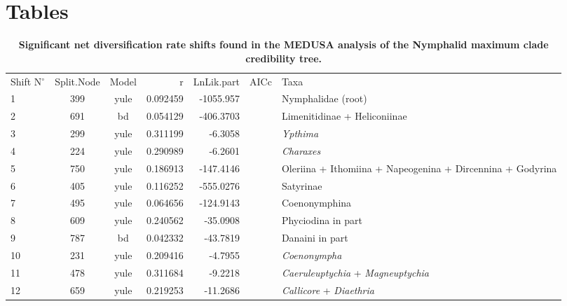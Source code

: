 \documentclass[10pt]{article}
\begin{document}
\section*{Tables}
\begin{table}[!h]
\caption{\bf{Significant net diversification rate shifts found in the MEDUSA analysis of the Nymphalid maximum clade credibility tree.}}
\begin{tabular}{lccrrcl}
Shift N$^\circ$ & Split.Node & Model & r          & LnLik.part & AICc     & Taxa                                                       \\
1               & 399        & yule  & 0.092459   & -1055.957  &          & Nymphalidae (root)                                         \\
2               & 691        & bd    & 0.054129   & -406.3703  &          & Limenitidinae + Heliconiinae                               \\
3               & 299        & yule  & 0.311199   & -6.3058    &          & \emph{Ypthima}                                             \\
4               & 224        & yule  & 0.290989   & -6.2601    &          & \emph{Charaxes}                                            \\
5               & 750        & yule  & 0.186913   & -147.4146  &          & Oleriina + Ithomiina + Napeogenina + Dircennina + Godyrina \\
6               & 405        & yule  & 0.116252   & -555.0276  &          & Satyrinae                                                   \\
7               & 495        & yule  & 0.064656   & -124.9143  &          & Coenonymphina                                              \\
8               & 609        & yule  & 0.240562   & -35.0908   &          & Phyciodina in part                                         \\
9               & 787        & bd    & 0.042332   & -43.7819   &          & Danaini in part                                            \\
10              & 231        & yule  & 0.209416   & -4.7955    &          & \emph{Coenonympha}                                         \\
11              & 478        & yule  & 0.311684   & -9.2218    &          & \emph{Caeruleuptychia} + \emph{Magneuptychia}              \\
12              & 659        & yule  & 0.219253   & -11.2686   &          & \emph{Callicore} + \emph{Diaethria}                        \\

\end{tabular}
\end{table}
\end{document}
